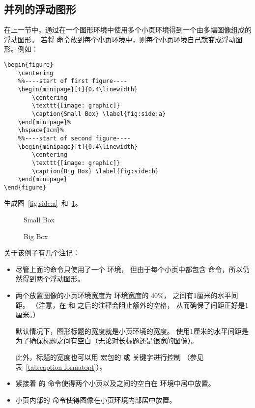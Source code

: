 \subsection{并列的浮动图形}\label{ssec:sidefigure}

在上一节中，通过在一个图形环境中使用多个小页环境得到一个由多幅图像组成的浮动图形。
若将   命令放到每个小页环境中，则每个小页环境自己就变成浮动图形。例如：
\begin{lstlisting}
\begin{figure}
	\centering
	%%----start of first figure----
	\begin{minipage}[t]{0.4\linewidth}
		\centering
		\texttt{[image: graphic]}
		\caption{Small Box} \label{fig:side:a}
	\end{minipage}%
	\hspace{1cm}%
	%%----start of second figure----
	\begin{minipage}[t]{0.4\linewidth}
		\centering
		\texttt{[image: graphic]}
		\caption{Big Box} \label{fig:side:b}
	\end{minipage}
\end{figure}
\end{lstlisting}
生成图~\ref{fig:side:a}~和~\ref{fig:side:b}。

\begin{figure}
	\centering
	\begin{minipage}[t]{0.4\linewidth}
		\centering
		\resizebox{1in}{!}{\usebox{\boxgraphic}}
		\caption{Small Box} \label{fig:side:a}
	\end{minipage}%
	\hspace{1cm}%
	\begin{minipage}[t]{0.4\linewidth}
		\centering
		\resizebox{1.5in}{!}{\usebox{\boxgraphic}}
		\caption{Big Box} \label{fig:side:b}
	\end{minipage}
\end{figure}

关于该例子有几个注记：
\begin{itemize}
	\item 尽管上面的命令只使用了一个  环境，
	但由于每个小页中都包含  命令，所以仍然得到两个浮动图形。
	
	\item 两个放置图像的小页环境宽度为  环境宽度的 $40\percent$，
	之间有1厘米的水平间距。
	（注意，在  和  之后的注释会阻止额外的空格，
	从而确保了间距正好是1厘米。）
	
	默认情况下，图形标题的宽度就是小页环境的宽度。
	使用1厘米的水平间距是为了确保标题之间有空白（无论对长标题还是很宽的图像）。
	
	此外，标题的宽度也可以用  宏包的  或  关键字进行控制
	（参见表~\ref{tab:caption-formatopt}）。
	
	\item 紧接着  的  命令使得两个小页以及之间的空白在  环境中居中放置。
		
	\item 小页内部的  命令使得图像在小页环境内部居中放置。
\end{itemize}

